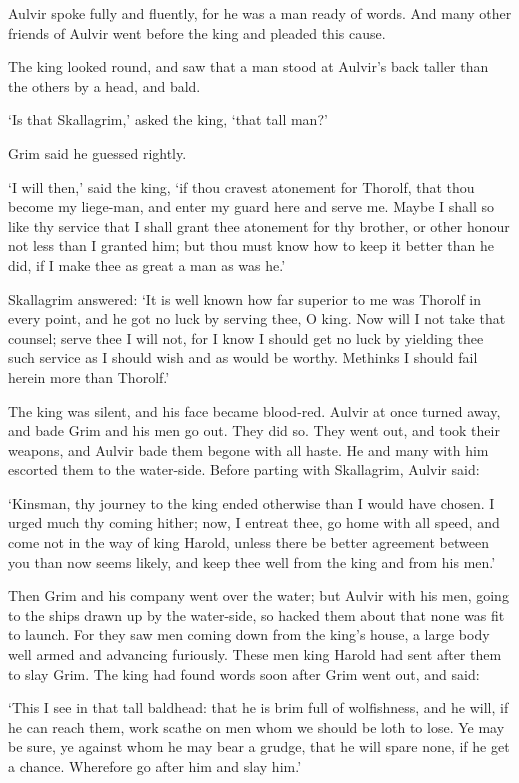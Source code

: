 Aulvir spoke fully and fluently, for he was a man ready of words. And many other friends of Aulvir went before the king and pleaded this cause.

The king looked round, and saw that a man stood at Aulvir's back taller than the others by a head, and bald.

`Is that Skallagrim,' asked the king, `that tall man?'

Grim said he guessed rightly.

`I will then,' said the king, `if thou cravest atonement for Thorolf, that thou become my liege-man, and enter my guard here and serve me. Maybe I shall so like thy service that I shall grant thee atonement for thy brother, or other honour not less than I granted him; but thou must know how to keep it better than he did, if I make thee as great a man as was he.'

Skallagrim answered: `It is well known how far superior to me was Thorolf in every point, and he got no luck by serving thee, O king. Now will I not take that counsel; serve thee I will not, for I know I should get no luck by yielding thee such service as I should wish and as would be worthy. Methinks I should fail herein more than Thorolf.'

The king was silent, and his face became blood-red. Aulvir at once turned away, and bade Grim and his men go out. They did so. They went out, and took their weapons, and Aulvir bade them begone with all haste. He and many with him escorted them to the water-side. Before parting with Skallagrim, Aulvir said:

`Kinsman, thy journey to the king ended otherwise than I would have chosen. I urged much thy coming hither; now, I entreat thee, go home with all speed, and come not in the way of king Harold, unless there be better agreement between you than now seems likely, and keep thee well from the king and from his men.'

Then Grim and his company went over the water; but Aulvir with his men, going to the ships drawn up by the water-side, so hacked them about that none was fit to launch. For they saw men coming down from the king's house, a large body well armed and advancing furiously. These men king Harold had sent after them to slay Grim. The king had found words soon after Grim went out, and said:

`This I see in that tall baldhead: that he is brim full of wolfishness, and he will, if he can reach them, work scathe on men whom we should be loth to lose. Ye may be sure, ye against whom he may bear a grudge, that he will spare none, if he get a chance. Wherefore go after him and slay him.'

